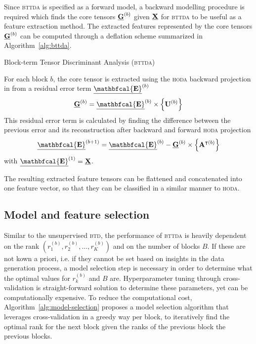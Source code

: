 \documentclass[twocolumn]{article}
\begin{document}
Since \textsc{bttda} is specified as a forward model, a backward modelling
procedure is required which finds the core tensors $\underline{\mathbf{G}}^{(b)}$ given $\underline{\mathbf{X}}$ for
\textsc{bttda} to be useful as a feature extraction method.
The extracted features represented by the core tensors $\underline{\mathbf{G}}^{(b)}$ can be
computed through a deflation scheme summarized in Algorithm~\ref{alg:bttda}.
\begin{algorithm}
  \caption{Block-term Tensor Discriminant Analysis (\textsc{bttda})}
  \label{alg:bttda}
  
\end{algorithm}
For each block $b$, the core tensor is extracted using the \textsc{hoda} backward
projection in from a residual error term
$\ten{\mathbfcal{E}}^{(b)}$
\begin{equation}
  \ten{G}^{(b)} = \ten{\mathbfcal{E}}^{(b)}\mmpr{\mat{U}^{(b)}}
\end{equation}
This residual error term is calculated by finding the difference between the
previous error and its reconstruction after backward and forward \textsc{hoda}
projection
\begin{equation}
  \ten{\mathbfcal{E}}^{(b+1)} = \ten{\mathbfcal{E}}^{(b)} - \ten{G}^{(b)}
  \mmpr{\mat{A}^{\intercal(b)}}
\end{equation}
with $\ten{\mathbfcal{E}}^{(1)}=\ten{X}$.

The resulting extracted feature tensors can be flattened and concatenated into
one feature vector, so that they can be classified in a similar manner to
\textsc{hoda}.


\subsection{Model and feature selection}
Similar to the unsupervised \textsc{btd}, the performance of \textsc{bttda} is
heavily dependent on the rank $\left(r_1^{(b)}, r_2^{(b)}, \ldots,
r_K^{(b)}\right)$ and on the number of blocks $B$.
If these are not kown a priori, i.e. if they cannot be set based on insights in the
data generation process, a model selection step is necessary in order to
determine what the optimal values for $r_k^{(b)}$ and $B$ are.
Hyperparameter tuning through cross-validation is straight-forward solution to
determine these parameters, yet can be computationally expensive.
To reduce the computational cost, Algorithm~\ref{alg:model-selection} proposes a model selection algorithm that
leverages cross-validation in a greedy way per block, to iteratively find the
optimal rank for the next block given the ranks of the previous block the previous blocks.
\end{document}
